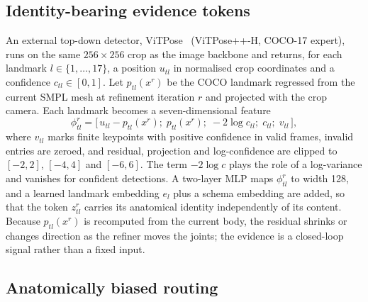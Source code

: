 \subsection{Identity-bearing evidence tokens}
\label{sec:tokens}

An external top-down detector, ViTPose~\cite{xu2022vitpose,xu2024vitposepp} (ViTPose++-H, COCO-17 expert), runs on the same $256\times256$ crop as the image backbone and returns, for each landmark $l\in\{1,\dots,17\}$, a position $u_{tl}$ in normalised crop coordinates and a confidence $c_{tl}\in[0,1]$.
Let $p_{tl}(x^r)$ be the COCO landmark regressed from the current SMPL mesh at refinement iteration $r$ and projected with the crop camera.
Each landmark becomes a seven-dimensional feature
\begin{equation}
  \phi^r_{tl} = \big[\,u_{tl}-p_{tl}(x^r);\; p_{tl}(x^r);\; -2\log c_{tl};\; c_{tl};\; v_{tl}\,\big],
  \label{eq:token}
\end{equation}
where $v_{tl}$ marks finite keypoints with positive confidence in valid frames, invalid entries are zeroed, and residual, projection and log-confidence are clipped to $[-2,2]$, $[-4,4]$ and $[-6,6]$.
The term $-2\log c$ plays the role of a log-variance and vanishes for confident detections.
A two-layer MLP maps $\phi^r_{tl}$ to width 128, and a learned landmark embedding $e_l$ plus a schema embedding are added, so that the token $z^r_{tl}$ carries its anatomical identity independently of its content.
Because $p_{tl}(x^r)$ is recomputed from the current body, the residual shrinks or changes direction as the refiner moves the joints; the evidence is a closed-loop signal rather than a fixed input.

\subsection{Anatomically biased routing}
\label{sec:routing}

